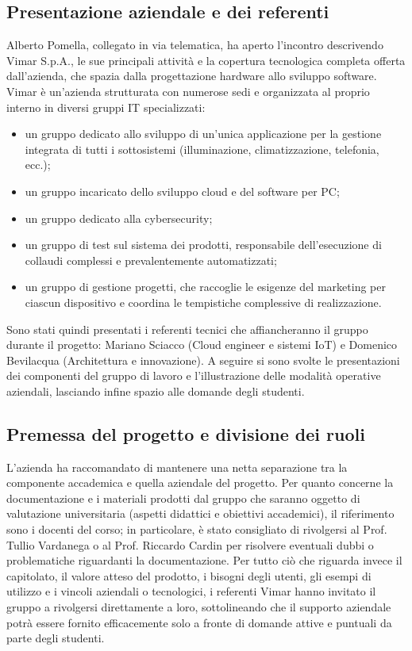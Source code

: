 \documentclass[11pt, a4paper]{article}
\begin{document}
\subsection{Presentazione aziendale e dei referenti}
Alberto Pomella, collegato in via telematica, ha aperto l'incontro descrivendo Vimar S.p.A., le sue principali attività e la copertura tecnologica completa offerta dall'azienda, che spazia dalla progettazione hardware allo sviluppo software. Vimar è un'azienda strutturata con numerose sedi e organizzata al proprio interno in diversi gruppi IT specializzati:
\begin{itemize}
    \item un gruppo dedicato allo sviluppo di un'unica applicazione per la gestione integrata di tutti i sottosistemi (illuminazione, climatizzazione, telefonia, ecc.);
    \item un gruppo incaricato dello sviluppo cloud e del software per PC;
    \item un gruppo dedicato alla cybersecurity;
    \item un gruppo di test sul sistema dei prodotti, responsabile dell'esecuzione di collaudi complessi e prevalentemente automatizzati;
    \item un gruppo di gestione progetti, che raccoglie le esigenze del marketing per ciascun dispositivo e coordina le tempistiche complessive di realizzazione.
\end{itemize}
Sono stati quindi presentati i referenti tecnici che affiancheranno il gruppo durante il progetto: Mariano Sciacco (Cloud engineer e sistemi IoT) e Domenico Bevilacqua (Architettura e innovazione). A seguire si sono svolte le presentazioni dei componenti del gruppo di lavoro e l'illustrazione delle modalità operative aziendali, lasciando infine spazio alle domande degli studenti.

\subsection{Premessa del progetto e divisione dei ruoli}
L'azienda ha raccomandato di mantenere una netta separazione tra la componente accademica e quella aziendale del progetto. Per quanto concerne la documentazione e i materiali prodotti dal gruppo che saranno oggetto di valutazione universitaria (aspetti didattici e obiettivi accademici), il riferimento sono i docenti del corso; in particolare, è stato consigliato di rivolgersi al Prof. Tullio Vardanega o al Prof. Riccardo Cardin per risolvere eventuali dubbi o problematiche riguardanti la documentazione. Per tutto ciò che riguarda invece il capitolato, il valore atteso del prodotto, i bisogni degli utenti, gli esempi di utilizzo e i vincoli aziendali o tecnologici, i referenti Vimar hanno invitato il gruppo a rivolgersi direttamente a loro, sottolineando che il supporto aziendale potrà essere fornito efficacemente solo a fronte di domande attive e puntuali da parte degli studenti.
\end{document}

